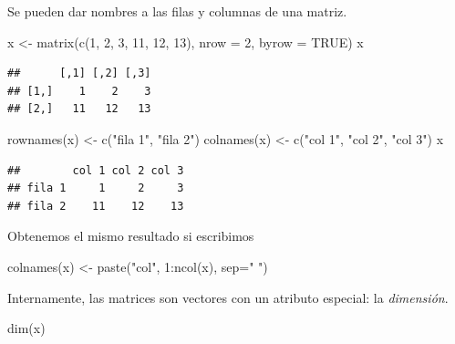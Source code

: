 \documentclass[
]{book}
\newenvironment{Shaded}{\begin{snugshade}}{\end{snugshade}}
\newcommand{\AttributeTok}[1]{\textcolor[rgb]{0.77,0.63,0.00}{#1}}
\newcommand{\ConstantTok}[1]{\textcolor[rgb]{0.00,0.00,0.00}{#1}}
\newcommand{\DecValTok}[1]{\textcolor[rgb]{0.00,0.00,0.81}{#1}}
\newcommand{\FunctionTok}[1]{\textcolor[rgb]{0.00,0.00,0.00}{#1}}
\newcommand{\NormalTok}[1]{#1}
\newcommand{\OtherTok}[1]{\textcolor[rgb]{0.56,0.35,0.01}{#1}}
\newcommand{\SpecialCharTok}[1]{\textcolor[rgb]{0.00,0.00,0.00}{#1}}
\newcommand{\StringTok}[1]{\textcolor[rgb]{0.31,0.60,0.02}{#1}}
\theoremstyle{break}
\theoremstyle{nonumberplain}
\begin{document}
Se pueden dar nombres a las filas y columnas de una matriz.

\begin{Shaded}
\begin{Highlighting}[]
\NormalTok{x }\OtherTok{\textless{}{-}} \FunctionTok{matrix}\NormalTok{(}\FunctionTok{c}\NormalTok{(}\DecValTok{1}\NormalTok{, }\DecValTok{2}\NormalTok{, }\DecValTok{3}\NormalTok{, }\DecValTok{11}\NormalTok{, }\DecValTok{12}\NormalTok{, }\DecValTok{13}\NormalTok{), }\AttributeTok{nrow =} \DecValTok{2}\NormalTok{, }\AttributeTok{byrow =} \ConstantTok{TRUE}\NormalTok{)}
\NormalTok{x}
\end{Highlighting}
\end{Shaded}

\begin{verbatim}
##      [,1] [,2] [,3]
## [1,]    1    2    3
## [2,]   11   12   13
\end{verbatim}

\begin{Shaded}
\begin{Highlighting}[]
\FunctionTok{rownames}\NormalTok{(x) }\OtherTok{\textless{}{-}} \FunctionTok{c}\NormalTok{(}\StringTok{"fila 1"}\NormalTok{, }\StringTok{"fila 2"}\NormalTok{)}
\FunctionTok{colnames}\NormalTok{(x) }\OtherTok{\textless{}{-}} \FunctionTok{c}\NormalTok{(}\StringTok{"col 1"}\NormalTok{, }\StringTok{"col 2"}\NormalTok{, }\StringTok{"col 3"}\NormalTok{)}
\NormalTok{x }
\end{Highlighting}
\end{Shaded}

\begin{verbatim}
##        col 1 col 2 col 3
## fila 1     1     2     3
## fila 2    11    12    13
\end{verbatim}

Obtenemos el mismo resultado si escribimos

\begin{Shaded}
\begin{Highlighting}[]
\FunctionTok{colnames}\NormalTok{(x) }\OtherTok{\textless{}{-}} \FunctionTok{paste}\NormalTok{(}\StringTok{"col"}\NormalTok{, }\DecValTok{1}\SpecialCharTok{:}\FunctionTok{ncol}\NormalTok{(x), }\AttributeTok{sep=}\StringTok{" "}\NormalTok{)}
\end{Highlighting}
\end{Shaded}

Internamente, las matrices son vectores con un atributo especial: la \emph{dimensión}.

\begin{Shaded}
\begin{Highlighting}[]
\FunctionTok{dim}\NormalTok{(x)}
\end{Highlighting}
\end{Shaded}
\end{document}
